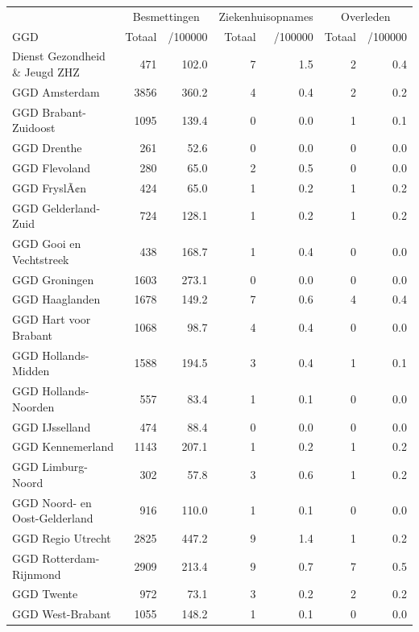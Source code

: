 \documentclass[
  english,
  man,floatsintext]{apa6}
\begin{document}
\begin{table}
\centering\begingroup\fontsize{10}{12}\selectfont

\begin{threeparttable}
\begin{tabular}{lrrrrrr}
\toprule
\multicolumn{1}{c}{ } & \multicolumn{2}{c}{Besmettingen} & \multicolumn{2}{c}{Ziekenhuisopnames} & \multicolumn{2}{c}{Overleden} \\
\cmidrule(l{3pt}r{3pt}){2-3} \cmidrule(l{3pt}r{3pt}){4-5} \cmidrule(l{3pt}r{3pt}){6-7}
GGD & Totaal & /100000 & Totaal & /100000 & Totaal & /100000\\
\midrule
Dienst Gezondheid \& Jeugd ZHZ & 471 & 102.0 & 7 & 1.5 & 2 & 0.4\\
GGD Amsterdam & 3856 & 360.2 & 4 & 0.4 & 2 & 0.2\\
GGD Brabant-Zuidoost & 1095 & 139.4 & 0 & 0.0 & 1 & 0.1\\
GGD Drenthe & 261 & 52.6 & 0 & 0.0 & 0 & 0.0\\
GGD Flevoland & 280 & 65.0 & 2 & 0.5 & 0 & 0.0\\
GGD FryslÃ¢n & 424 & 65.0 & 1 & 0.2 & 1 & 0.2\\
GGD Gelderland-Zuid & 724 & 128.1 & 1 & 0.2 & 1 & 0.2\\
GGD Gooi en Vechtstreek & 438 & 168.7 & 1 & 0.4 & 0 & 0.0\\
GGD Groningen & 1603 & 273.1 & 0 & 0.0 & 0 & 0.0\\
GGD Haaglanden & 1678 & 149.2 & 7 & 0.6 & 4 & 0.4\\
GGD Hart voor Brabant & 1068 & 98.7 & 4 & 0.4 & 0 & 0.0\\
GGD Hollands-Midden & 1588 & 194.5 & 3 & 0.4 & 1 & 0.1\\
GGD Hollands-Noorden & 557 & 83.4 & 1 & 0.1 & 0 & 0.0\\
GGD IJsselland & 474 & 88.4 & 0 & 0.0 & 0 & 0.0\\
GGD Kennemerland & 1143 & 207.1 & 1 & 0.2 & 1 & 0.2\\
GGD Limburg-Noord & 302 & 57.8 & 3 & 0.6 & 1 & 0.2\\
GGD Noord- en Oost-Gelderland & 916 & 110.0 & 1 & 0.1 & 0 & 0.0\\
GGD Regio Utrecht & 2825 & 447.2 & 9 & 1.4 & 1 & 0.2\\
GGD Rotterdam-Rijnmond & 2909 & 213.4 & 9 & 0.7 & 7 & 0.5\\
GGD Twente & 972 & 73.1 & 3 & 0.2 & 2 & 0.2\\
GGD West-Brabant & 1055 & 148.2 & 1 & 0.1 & 0 & 0.0\\

\end{tabular}
\end{threeparttable}
\end{table}
\end{document}
